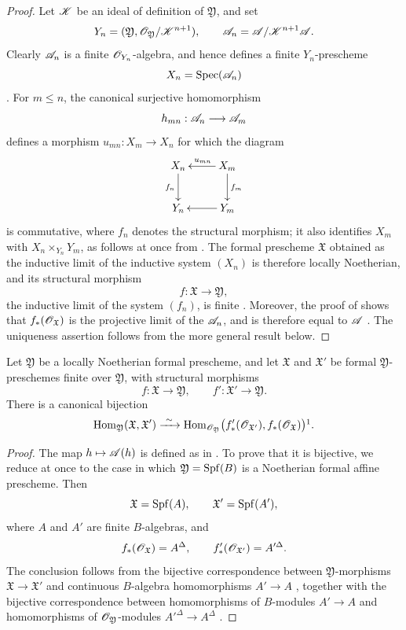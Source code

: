 \begin{proof}
Let $\mathscr{K}$ be an ideal of definition of $\mathfrak{Y}$, and set
\[
  Y_n=(\mathfrak{Y},
       \mathscr{O}_{\mathfrak{Y}}/\mathscr{K}^{n+1}),
  \qquad
  \mathscr{A}_n=\mathscr{A}/\mathscr{K}^{n+1}\mathscr{A}.
\]
Clearly $\mathscr{A}_n$ is a finite $\mathscr{O}_{Y_n}$-algebra, and hence
defines a finite $Y_n$-prescheme
\[
  X_n=\operatorname{Spec}(\mathscr{A}_n)
\]
.  For $m\leq n$, the canonical surjective
homomorphism
\[
  h_{mn}:\mathscr{A}_n\longrightarrow\mathscr{A}_m
\]
defines a morphism $u_{mn}:X_m\to X_n$ for which the diagram
\[
  \xymatrix{
    X_n\ar[d]_{f_n} &
    X_m\ar[l]_{u_{mn}}\ar[d]^{f_m}\\
    Y_n &
    Y_m\ar[l]
  }
\]
is commutative, where $f_n$ denotes the structural morphism; it
also identifies $X_m$ with
$X_n\times_{Y_n}Y_m$, as follows at once from
.  The formal prescheme $\mathfrak{X}$ obtained
as the inductive limit of the inductive system $(X_n)$ is therefore
locally Noetherian, and its structural morphism
\[
  f:\mathfrak{X}\longrightarrow\mathfrak{Y},
\]
the inductive limit of the system $(f_n)$, is finite
 .  Moreover, the proof of
 shows that
$f_*(\mathscr{O}_{\mathfrak{X}})$ is the projective limit of the
$\mathscr{A}_n$, and is therefore equal to $\mathscr{A}$
.  The uniqueness assertion follows from the
more general result below.
\end{proof}

\begin{proposition}[4.8.8]
\label{III.4.8.8}
Let $\mathfrak{Y}$ be a locally Noetherian formal prescheme, and
let $\mathfrak{X}$ and $\mathfrak{X}'$ be formal
$\mathfrak{Y}$-preschemes finite over $\mathfrak{Y}$, with
structural morphisms
\[
  f:\mathfrak{X}\to\mathfrak{Y},\qquad
  f':\mathfrak{X}'\to\mathfrak{Y}.
\]
There is a canonical bijection
\[
  \Hom_{\mathfrak{Y}}(\mathfrak{X},\mathfrak{X}')
  \xrightarrow{\ \sim\ }
  \Hom_{\sh{O}_{\mathfrak{Y}}}
  \bigl(f'_*(\sh{O}_{\mathfrak{X}'}),
        f_*(\sh{O}_{\mathfrak{X}})\bigr)\footnotemark.
\]
\end{proposition}

\begin{proof}
The map $h\mapsto\mathscr{A}(h)$ is defined as in
.  To prove that it is bijective, we reduce at
once to the case in which
$\mathfrak{Y}=\operatorname{Spf}(B)$ is a Noetherian formal affine prescheme.
Then
\[
  \mathfrak{X}=\operatorname{Spf}(A),\qquad
  \mathfrak{X}'=\operatorname{Spf}(A'),
\]
where $A$ and $A'$ are finite $B$-algebras, and
\[
  f_*(\mathscr{O}_{\mathfrak{X}})=A^\Delta,\qquad
  f'_*(\mathscr{O}_{\mathfrak{X}'})=A'^\Delta.
\]
The conclusion follows from the bijective correspondence between
$\mathfrak{Y}$-morphisms
$\mathfrak{X}\to\mathfrak{X}'$ and continuous $B$-algebra
homomorphisms $A'\to A$ , together with the
bijective correspondence between homomorphisms of $B$-modules
$A'\to A$ and homomorphisms of
$\mathscr{O}_{\mathfrak{Y}}$-modules
$A'^\Delta\to A^\Delta$ .
\end{proof}

